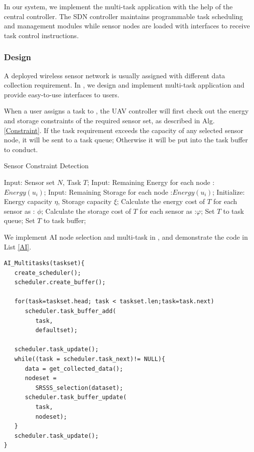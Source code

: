 In our {\sdn} system, we implement the multi-task application 
with the help of the central controller. The SDN controller
maintains programmable task scheduling and management
modules while sensor nodes are loaded with interfaces to
receive task control instructions.     

\subsubsection{Design}

A deployed wireless sensor network is usually assigned  with
different data collection requirement. In {\sdn}, we design and 
implement multi-task application and provide easy-to-use
interfaces to users.

When a user assigns a task to {\sdn}, the UAV controller will first check out 
the energy and storage constraints of the required sensor set, as described in Alg. \ref{Constraint}. 
If the task requirement exceeds the capacity of any selected sensor node, it will be sent to a     
task queue; Otherwise it will be put into the task buffer to conduct.


\begin{algorithm}
\caption{Sensor Constraint Detection}
\label{Constraint}
\begin{algorithmic}[1]
\STATE Input: Sensor set $N$, Task $T$;
\STATE Input: Remaining Energy for each node :$Energy(u_i)$;
\STATE Input: Remaining Storage for each node :$Energy(u_i)$;
\STATE Initialize: Energy capacity $\eta$, Storage capacity $\xi$;
\STATE Calculate the energy cost of $T$ for each sensor as : $\phi$;
\STATE Calculate the storage cost of $T$ for each sensor as :$\varphi$;
   	 \STATE Set $T$ to task queue;
   	 \ENDIF
\ENDFOR
\STATE Set $T$ to task buffer;
\end{algorithmic}
\end{algorithm}
We implement AI node selection and multi-task in {\sdn}, and demonstrate the code in List \ref{AI}.


\begin{lstlisting}[language={[ANSI]C},label=AI,
	caption={An example of AI selection and Muti-tasks},
	keywordstyle=\color{blue!70},
	showstringspaces=false,
	commentstyle=\color{red!50!green!80!blue!70},
	frame=single,captionpos=t,
	rulesepcolor=\color{red!20!green!20!blue!20},
	basicstyle=\ttfamily]
AI_Multitasks(taskset){
   create_scheduler();
   scheduler.create_buffer();

   for(task=taskset.head; task < taskset.len;task=task.next)
      scheduler.task_buffer_add(
         task,
         defaultset);

   scheduler.task_update();
   while((task = scheduler.task_next)!= NULL){
      data = get_collected_data();
      nodeset =
         SRSSS_selection(dataset);
      scheduler.task_buffer_update(
         task,
         nodeset);
   }
   scheduler.task_update();
}

\end{lstlisting}

